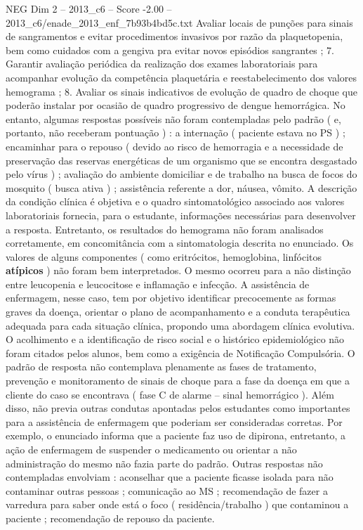 \begin{textsample}{NEG Dim 2 – 2013\_c6 – Score -2.00 – 2013\_c6/enade\_2013\_enf\_7b93b4bd5c.txt}
Avaliar locais de punções para sinais de sangramentos e evitar procedimentos invasivos por razão da plaquetopenia, bem como cuidados com a gengiva pra evitar novos episódios sangrantes ; 7.
Garantir avaliação periódica da realização dos exames laboratoriais para acompanhar evolução da competência plaquetária e reestabelecimento dos valores hemograma ; 8.
Avaliar os sinais indicativos de evolução de quadro de choque que poderão instalar por ocasião de quadro progressivo de dengue hemorrágica.
No entanto, algumas respostas possíveis não foram contempladas pelo padrão ( e, portanto, não receberam pontuação ) : a internação ( paciente estava no PS ) ; encaminhar para o repouso ( devido ao risco de hemorragia e a necessidade de preservação das reservas energéticas de um organismo que se encontra desgastado pelo vírus ) ; avaliação do ambiente domiciliar e de trabalho na busca de focos do mosquito ( busca ativa ) ; assistência referente a dor, náusea, vômito.
A descrição da condição clínica é objetiva e o quadro sintomatológico associado aos valores laboratoriais fornecia, para o estudante, informações necessárias para desenvolver a resposta.
Entretanto, os resultados do hemograma não foram analisados corretamente, em concomitância com a sintomatologia descrita no enunciado.
Os valores de alguns componentes ( como eritrócitos, hemoglobina, linfócitos \textbf{atípicos} ) não foram bem interpretados.
O mesmo ocorreu para a não distinção entre leucopenia e leucocitose e inflamação e infecção.
A assistência de enfermagem, nesse caso, tem por objetivo identificar precocemente as formas graves da doença, orientar o plano de acompanhamento e a conduta terapêutica adequada para cada situação clínica, propondo uma abordagem clínica evolutiva.
O acolhimento e a identificação de risco social e o histórico epidemiológico não foram citados pelos alunos, bem como a exigência de Notificação Compulsória.
O padrão de resposta não contemplava plenamente as fases de tratamento, prevenção e monitoramento de sinais de choque para a fase da doença em que a cliente do caso se encontrava ( fase C de alarme – sinal hemorrágico ).
Além disso, não previa outras condutas apontadas pelos estudantes como importantes para a assistência de enfermagem que poderiam ser consideradas corretas.
Por exemplo, o enunciado informa que a paciente faz uso de dipirona, entretanto, a ação de enfermagem de suspender o medicamento ou orientar a não administração do mesmo não fazia parte do padrão.
Outras respostas não contempladas envolviam : aconselhar que a paciente ficasse isolada para não contaminar outras pessoas ; comunicação ao MS ; recomendação de fazer a varredura para saber onde está o foco ( residência/trabalho ) que contaminou a paciente ; recomendação de repouso da paciente.

\end{textsample}
